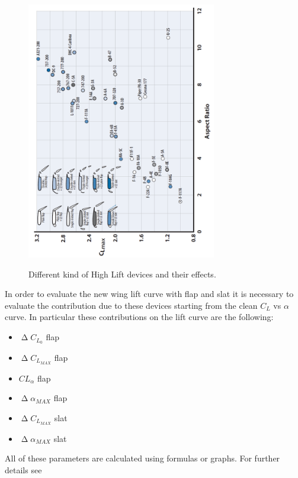 \begin{figure}[H]
\centering
{\includegraphics[height=11.3cm, angle =-90 ]{Immagini/highlift.png}} 
\caption{Different kind of High Lift devices and their effects.}
\label{fig:hl}
\end{figure}

In order to evaluate the new wing lift curve with flap and slat it is necessary to evaluate the contribution due to these devices starting from the clean $C_L$ vs $\alpha$ curve. In particular these contributions on the lift curve are the following:

\begin{itemize}
\item $\upDelta C_{L_0} $ flap 
\item $\upDelta C_{L_{MAX}} $ flap
\item $CL_{\alpha}$ flap 
\item $\upDelta \alpha_{MAX} $ flap
\item $\upDelta C_{L_{MAX}} $ slat
\item $\upDelta \alpha_{MAX} $ slat
\end{itemize}


All of these parameters are calculated using formulas or graphs. For further details see \cite{nicolai2010fundamentals}


